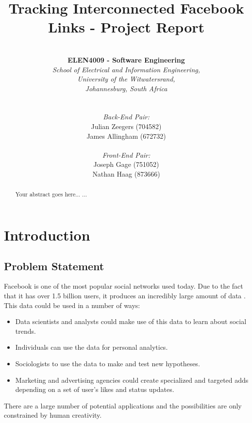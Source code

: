 \documentclass[12pt,onecolumn]{article}
\title{\huge Tracking Interconnected Facebook Links - Project Report}
\author{ \horrule{1pt} \\ \textbf{ELEN4009 - Software Engineering} \\ \emph{School of Electrical and Information Engineering,} \\ \emph{University of the Witwatersrand,} \\ \emph{Johannesburg, South Africa} \\ \horrule{1pt} \\\\ \emph{Back-End Pair:} \\ Julian Zeegers (704582) \\ James Allingham (672732) \\ \\ \emph{Front-End Pair:} \\ Joseph Gage (751052)\\ Nathan Haag (873666) \\ \horrule{1pt}}
\begin{document}
	
	\date{\vspace{-5ex}}
	\maketitle
	\pagestyle{plain}
	\thispagestyle{empty}
	
	\begin{abstract}
		Your abstract goes here...
		...
	\end{abstract}
	
	\newpage
	
	\tableofcontents
	\listoffigures
	\listoftables
	\thispagestyle{empty}
	\setcounter{page}{0}
	
	\newpage
	
	\section{Introduction}
	
	\subsection{Problem Statement} %
	
	Facebook is one of the most popular social networks used today. Due to the fact that it has over 1.5 billion users, it produces an incredibly large amount of data \cite{fb}. This data could be used in a number of ways:
	
	\begin{itemize}
		\item Data scientists and analysts could make use of this data to learn about social trends.
		
		\item Individuals can use the data for personal analytics.
		
		\item Sociologists to use the data to make and test new hypotheses.
		
		\item Marketing and advertising agencies could create specialized and targeted adds depending on a set of user's likes and status updates.
		
	\end{itemize}    
	
	There are a large number of potential applications and the possibilities are only constrained by human creativity.
	
\end{document}

